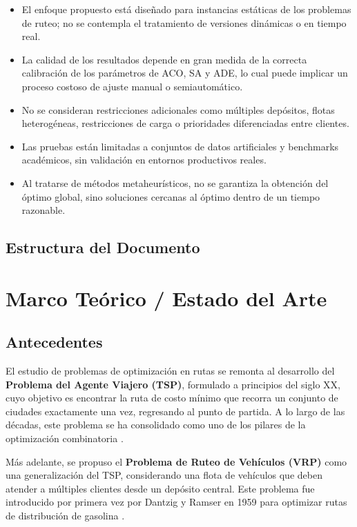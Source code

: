 \documentclass[12pt,titlepage,twoside,openright]{book}
\begin{document}
\begin{itemize}
	\item El enfoque propuesto está diseñado para instancias estáticas de los problemas de ruteo; no se contempla el tratamiento de versiones dinámicas o en tiempo real.

	\item La calidad de los resultados depende en gran medida de la correcta calibración de los parámetros de ACO, SA y ADE, lo cual puede implicar un proceso costoso de ajuste manual o semiautomático.

	\item No se consideran restricciones adicionales como múltiples depósitos, flotas heterogéneas, restricciones de carga o prioridades diferenciadas entre clientes.

	\item Las pruebas están limitadas a conjuntos de datos artificiales y benchmarks académicos, sin validación en entornos productivos reales.

	\item Al tratarse de métodos metaheurísticos, no se garantiza la obtención del óptimo global, sino soluciones cercanas al óptimo dentro de un tiempo razonable.
\end{itemize}


\section{Estructura del Documento}


\chapter{Marco Teórico / Estado del Arte}
\label{cap:marco-teorico}
\section{Antecedentes}

El estudio de problemas de optimización en rutas se remonta al desarrollo del \textbf{Problema del Agente Viajero (TSP)}, formulado a principios del siglo XX, cuyo objetivo es encontrar la ruta de costo mínimo que recorra un conjunto de ciudades exactamente una vez, regresando al punto de partida. A lo largo de las décadas, este problema se ha consolidado como uno de los pilares de la optimización combinatoria \citep{toth2014}.

Más adelante, se propuso el \textbf{Problema de Ruteo de Vehículos (VRP)} como una generalización del TSP, considerando una flota de vehículos que deben atender a múltiples clientes desde un depósito central. Este problema fue introducido por primera vez por Dantzig y Ramser en 1959 para optimizar rutas de distribución de gasolina \citep{dantzig1959truck}.
\end{document}
